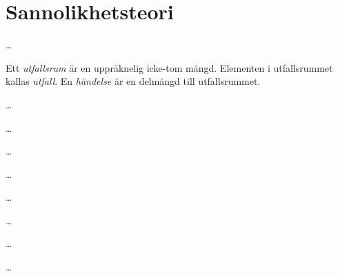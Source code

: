 %
%
%

\chapter{Sannolikhetsteori}
\label{ch:Sannolikhet}
\dots

\begin{definition}[Utfall]
  Ett \emph{utfallsrum} är en uppräknelig icke-tom mängd.
  Elementen i utfallsrummet kallas \emph{utfall}.
  En \emph{händelse} är en delmängd till utfallsrummet.
\end{definition}

\begin{definition}[Sannolikhetsmått]
  \dots
\end{definition}

\begin{definition}[Sannolikhetsrum]
  \dots
\end{definition}

\begin{theorem}
  \dots
\end{theorem}

\begin{theorem}
  \dots
\end{theorem}

\begin{definition}
  \dots
\end{definition}

\begin{definition}
  \dots
\end{definition}

\begin{definition}
  \dots
\end{definition}

\begin{theorem}
  \dots
\end{theorem}

